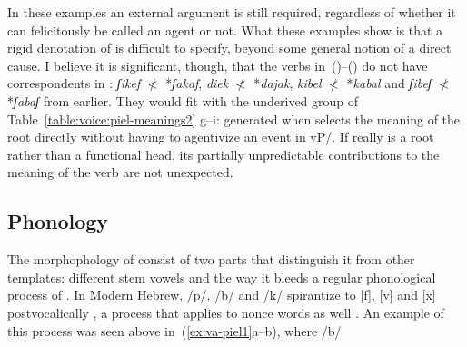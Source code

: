 \begin{exe}
\begin{xlist}
\begin{exe}
\begin{xlist}
\begin{exe}
\begin{xlist}
\begin{exe}
\begin{exe}
\begin{xlist}
\begin{exe}
\begin{xlist}
\begin{exe}
\begin{xlist}
\begin{exe}
\begin{xlist}
\begin{exe}
\begin{xlist}
\begin{exe}
\begin{xlist}
\begin{exe}
\begin{xlist}
\begin{exe}
\begin{xlist}
\begin{exe}
\begin{xlist}
\begin{exe}
\begin{xlist}
\begin{exe}
\begin{xlist}
\begin{exe}
\begin{xlist}
\begin{exe}
\begin{exe}
\begin{xlist}
\begin{exe}
\begin{xlist}
\begin{exe}
\begin{xlist}
\begin{exe}
\begin{xlist}
{\begin{exe}
\begin{xlist}
\begin{exe}
\begin{xlist}
\begin{exe}
\begin{xlist}
\begin{exe}
\begin{xlist}
\begin{xlist}
\begin{xlist}
\begin{exe}
\begin{xlist}
\begin{xlist}
\begin{xlist}
\begin{exe}
\begin{exe}
\begin{xlist}
\begin{exe}
\begin{xlist}
\begin{exe}
\begin{xlist}
\begin{exe}
\begin{xlist}
\begin{exe}
\begin{xlist}
\begin{exe}
\begin{xlist}
\begin{exe}
\begin{exe}
\begin{xlist}
\begin{xlist}
\begin{exe}
\begin{xlist}
\begin{exe}
\begin{xlist}
\begin{exe}
\begin{xlist}
\begin{exe}
\begin{xlist}
\begin{exe}
\begin{xlist}
\begin{exe}
\begin{xlist}
\begin{exe}
\begin{exe}
\begin{xlist}
\begin{exe}
\begin{xlist}
\begin{exe}
\begin{xlist}
\begin{exe}
\begin{xlist}
\begin{exe}
\begin{xlist}
\begin{exe}
\begin{xlist}
\begin{exe}
\begin{xlist}
 \z
{} 
  
 \z 

In these examples an external argument is still required, regardless of whether it can felicitously be called an agent or not. What these examples show is that a rigid denotation of {\va} is difficult to specify, beyond some general notion of a direct cause. I believe it is significant, though, that the verbs in~(\blastx)--(\lastx) do not have correspondents in {\tkal}: \emph{ʃikef} $\nless$ *\emph{ʃakaf}, \emph{diek} $\nless$ *\emph{dajak}, \emph{kibel} $\nless$ *\emph{kabal} and \emph{ʃibeʃ} $\nless$ *\emph{ʃabaʃ} from earlier. They would fit with the underived group of Table~\ref{table:voice:piel-meanings2} g--i: generated when {\va} selects the meaning of the root directly without having to agentivize an event in vP/{\tkal}. If {\va} really is a root rather than a functional head, its partially unpredictable contributions to the meaning of the verb are not unexpected.

	\subsection{Phonology} \label{voice:va:phono}
The morphophology of {\tpie} consist of two parts that distinguish it from other templates: different stem vowels and the way it bleeds a regular phonological process of . In Modern Hebrew, /p/, /b/ and /k/ spirantize to [f], [v] and [x] postvocalically \citep{adam02,temkinmartinez08wccfl,gouskova12nllt}, a process that applies to nonce words as well \citep{temkinmartinzemuellner16}. An example of this process was seen above in~(\ref{ex:va-piel1}a--b), where /b/ 
\end{xlist}
\end{exe}
\end{xlist}
\end{exe}
\end{xlist}
\end{exe}
\end{xlist}
\end{exe}
\end{xlist}
\end{exe}
\end{xlist}
\end{exe}
\end{xlist}
\end{exe}
\end{exe}
\end{xlist}
\end{exe}
\end{xlist}
\end{exe}
\end{xlist}
\end{exe}
\end{xlist}
\end{exe}
\end{xlist}
\end{exe}
\end{xlist}
\end{exe}
\end{xlist}
\end{xlist}
\end{exe}
\end{exe}
\end{xlist}
\end{exe}
\end{xlist}
\end{exe}
\end{xlist}
\end{exe}
\end{xlist}
\end{exe}
\end{xlist}
\end{exe}
\end{xlist}
\end{exe}
\end{exe}
\end{xlist}
\end{xlist}
\end{xlist}
\end{exe}
\end{xlist}
\end{xlist}
\end{xlist}
\end{exe}
\end{xlist}
\end{exe}
\end{xlist}
\end{exe}
\end{xlist}
\end{exe}}
\end{xlist}
\end{exe}
\end{xlist}
\end{exe}
\end{xlist}
\end{exe}
\end{xlist}
\end{exe}
\end{exe}
\end{xlist}
\end{exe}
\end{xlist}
\end{exe}
\end{xlist}
\end{exe}
\end{xlist}
\end{exe}
\end{xlist}
\end{exe}
\end{xlist}
\end{exe}
\end{xlist}
\end{exe}
\end{xlist}
\end{exe}
\end{xlist}
\end{exe}
\end{xlist}
\end{exe}
\end{xlist}
\end{exe}
\end{xlist}
\end{exe}
\end{exe}
\end{xlist}
\end{exe}
\end{xlist}
\end{exe}
\end{xlist}
\end{exe}
